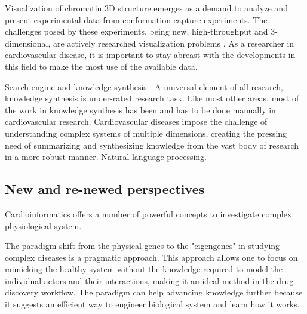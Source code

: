 \documentclass[letter]{bioinfo}
\begin{document}
Visualization of chromatin 3D structure emerges as a demand to analyze and present experimental data from conformation capture experiments. The challenges posed by these experiments, being new, high-throughput and  3-dimensional, are actively researched visualization problems \citep{Goodstadt:2017:Challenges}. As a researcher in cardiovascular disease, it is important to stay abreast with the developments in this field to make the most use of the available data.

Search engine and knowledge synthesis \citep{Lutjohann:2011:Sciencenet}. A universal element of all research, knowledge synthesis is under-rated research task. Like most other areas, most of the work in knowledge synthesis has been and has to be done manually in cardiovascular research. Cardiovascular diseases impose the challenge of understanding complex systems of multiple dimensions, creating the pressing need of summarizing and synthesizing knowledge from the vast body of research in a more robust manner. Natural language processing.



%
%

\subsection{New and re-newed perspectives}

Cardioinformatics offers a number of powerful concepts to investigate complex physiological system.

The paradigm shift from the physical genes to the "eigengenes" in studying complex diseases \citep{Weiss:2012:Good} is a pragmatic approach. This approach allows one to focus on mimicking the healthy system without the knowledge required to model the individual actors and their interactions, making it an ideal method in the drug discovery workflow. The paradigm can help advancing knowledge further because it suggests an efficient way to engineer biological system and learn how it works.
\end{document}
